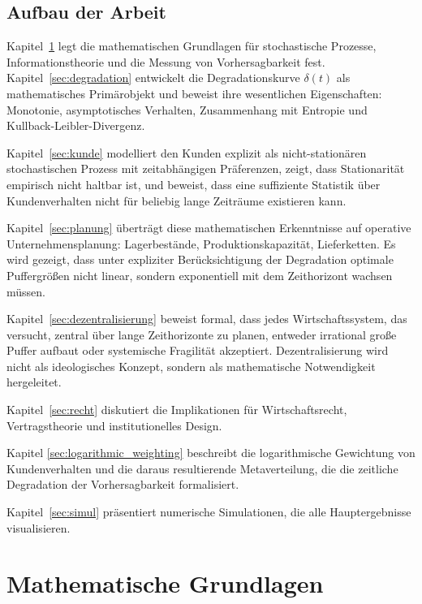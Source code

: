 \documentclass[a4paper, 12pt, twoside, openright]{report}
\theoremstyle{definition}
\theoremstyle{definition}
\begin{document}
\subsection{Aufbau der Arbeit}

Kapitel~\ref{sec:grundlagen} legt die mathematischen Grundlagen für stochastische Prozesse, Informationstheorie und die Messung von Vorhersagbarkeit fest. Kapitel~\ref{sec:degradation} entwickelt die Degradationskurve $\delta(t)$ als mathematisches Primärobjekt und beweist ihre wesentlichen Eigenschaften: Monotonie, asymptotisches Verhalten, Zusammenhang mit Entropie und Kullback-Leibler-Divergenz.

Kapitel~\ref{sec:kunde} modelliert den Kunden explizit als nicht-stationären stochastischen Prozess mit zeitabhängigen Präferenzen, zeigt, dass Stationarität empirisch nicht haltbar ist, und beweist, dass eine suffiziente Statistik über Kundenverhalten nicht für beliebig lange Zeiträume existieren kann.

Kapitel~\ref{sec:planung} überträgt diese mathematischen Erkenntnisse auf operative Unternehmensplanung: Lagerbestände, Produktionskapazität, Lieferketten. Es wird gezeigt, dass unter expliziter Berücksichtigung der Degradation optimale Puffergrößen nicht linear, sondern exponentiell mit dem Zeithorizont wachsen müssen.

Kapitel~\ref{sec:dezentralisierung} beweist formal, dass jedes Wirtschaftssystem, das versucht, zentral über lange Zeithorizonte zu planen, entweder irrational große Puffer aufbaut oder systemische Fragilität akzeptiert. Dezentralisierung wird nicht als ideologisches Konzept, sondern als mathematische Notwendigkeit hergeleitet.

Kapitel~\ref{sec:recht} diskutiert die Implikationen für Wirtschaftsrecht, Vertragstheorie und institutionelles Design. 

Kapitel \ref{sec:logarithmic_weighting} beschreibt die logarithmische Gewichtung von Kundenverhalten und die daraus resultierende Metaverteilung, die die zeitliche Degradation der Vorhersagbarkeit formalisiert.

Kapitel~\ref{sec:simul} präsentiert numerische Simulationen, die alle Hauptergebnisse visualisieren.

\section{Mathematische Grundlagen}
\label{sec:grundlagen}
\end{document}
